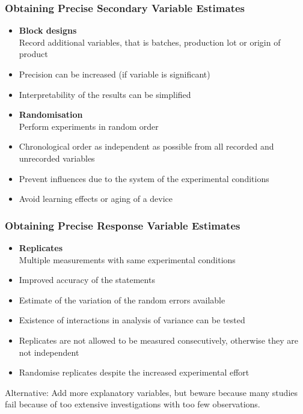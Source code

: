 \documentclass[11pt]{article}
\theoremstyle{definition}
\begin{document}
\subsubsection{Obtaining Precise Secondary Variable Estimates}
\begin{itemize}
	\item[] \textbf{Block designs}\\
	Record additional variables, that is batches, production lot or origin of product
	\item Precision can be increased (if variable is significant)
	\item Interpretability of the results can be simplified
	\item[] \textbf{Randomisation}\\
	Perform experiments in random order
	\item Chronological order as independent as possible from all recorded and unrecorded variables
	\item Prevent influences due to the system of the experimental conditions
	\item Avoid learning effects or aging of a device
\end{itemize}

\subsubsection{Obtaining Precise Response Variable Estimates}
\begin{itemize}
	\item[] \textbf{Replicates}\\
	Multiple measurements with same experimental conditions
	\item Improved accuracy of the statements
	\item Estimate of the variation of the random errors available
	\item Existence of interactions in analysis of variance can be tested
	\item Replicates are not allowed to be measured consecutively, otherwise they are not independent
	\item Randomise replicates despite the increased experimental effort
\end{itemize}
Alternative: Add more explanatory variables, but beware because many studies fail because of too extensive investigations with too few observations.


\end{document}
